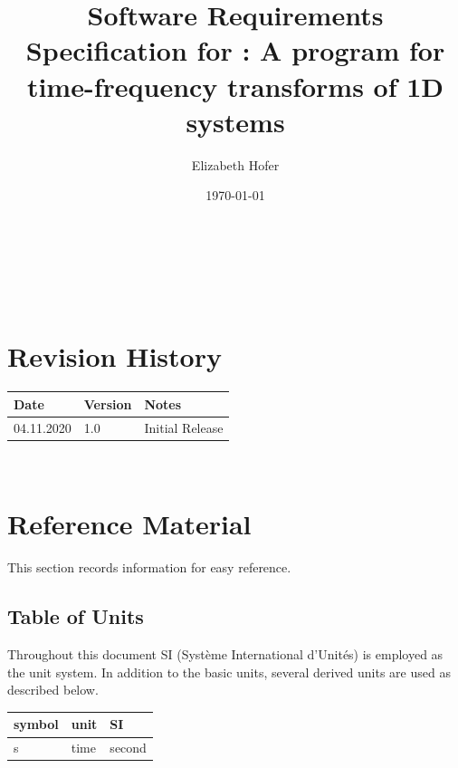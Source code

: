 \documentclass[12pt]{article}
\begin{document}
\title{Software Requirements Specification for \progname{}: A program for time-frequency transforms of 1D systems} 
\author{Elizabeth Hofer}
\date{\today}
	
\maketitle


~\newpage


\tableofcontents

~\newpage

\section*{Revision History}

\begin{tabularx}{\textwidth}{p{3cm}p{2cm}X}
\toprule {\bf Date} & {\bf Version} & {\bf Notes}\\
\midrule
04.11.2020 & 1.0 & Initial Release\\
\bottomrule
\end{tabularx}

~\newpage

\section{Reference Material}

This section records information for easy reference.

\subsection{Table of Units}

Throughout this document SI (Syst\`{e}me International d'Unit\'{e}s) is employed
as the unit system.  In addition to the basic units, several derived units are
used as described below.

\renewcommand{\arraystretch}{1.2}
\begin{table}[ht]
  \noindent \begin{tabular}{l l l} 
    \toprule		
    \textbf{symbol} & \textbf{unit} & \textbf{SI}\\
    \midrule 
    \si{\second} & time & second\\
    \bottomrule
  \end{tabular}
\end{table}
\end{document}
